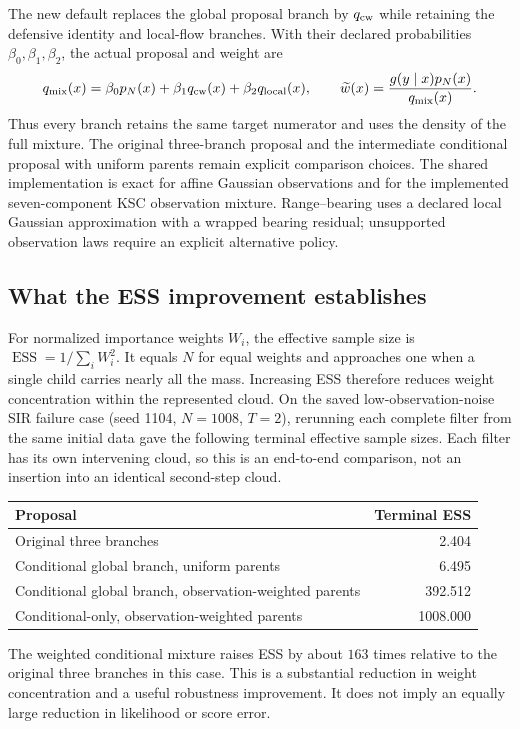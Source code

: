 The new default replaces the global proposal branch by $q_{\rm cw}$ while
retaining the defensive identity and local-flow branches. With their declared
probabilities $\beta_0,\beta_1,\beta_2$, the actual proposal and weight are
\begin{equation}
 q_{\rm mix}(x)=\beta_0 p_N(x)+\beta_1 q_{\rm cw}(x)
                       +\beta_2 q_{\rm local}(x),\qquad
 \widetilde w(x)=\frac{g(y\mid x)p_N(x)}{q_{\rm mix}(x)}.
\end{equation}
Thus every branch retains the same target numerator and uses the density of
the full mixture. The original three-branch proposal and the intermediate
conditional proposal with uniform parents remain explicit comparison choices.
The shared implementation is exact for affine Gaussian observations and for
the implemented seven-component KSC observation mixture. Range--bearing uses
a declared local Gaussian approximation with a wrapped bearing residual;
unsupported observation laws require an explicit alternative policy.

\subsection{What the ESS improvement establishes}
For normalized importance weights $W_i$, the effective sample size is
$\operatorname{ESS}=1/\sum_i W_i^2$. It equals $N$ for equal weights and
approaches one when a single child carries nearly all the mass. Increasing ESS
therefore reduces weight concentration within the represented cloud.
On the saved low-observation-noise SIR failure case (seed 1104, $N=1008$,
$T=2$), rerunning each complete filter from the same initial data gave the
following terminal effective sample sizes. Each filter has its own intervening
cloud, so this is an end-to-end comparison, not an insertion into an identical
second-step cloud.
\begin{center}
\begin{tabular}{lr}
\hline
Proposal & Terminal ESS\\\hline
Original three branches & 2.404\\
Conditional global branch, uniform parents & 6.495\\
Conditional global branch, observation-weighted parents & 392.512\\
Conditional-only, observation-weighted parents & 1008.000\\\hline
\end{tabular}
\end{center}
The weighted conditional mixture raises ESS by about $163$ times relative to
the original three branches in this case. This is a substantial reduction in
weight concentration and a useful robustness improvement. It does not imply
an equally large reduction in likelihood or score error.

